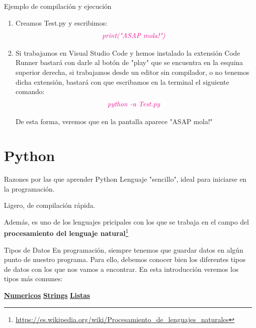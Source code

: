 \documentclass{beamer}
\begin{document}
	\begin{frame}{Ejemplo de compilación y ejecución}
	\begin{enumerate}
		\item Creamos Test.py y escribimos: 
		\begin{gather}
		\color{magenta}\textit{print("ASAP mola!")}
		\end{gather}
		\item Si trabajamos en Visual Studio Code y hemos instalado la extensión Code Runner bastará con darle al botón de "play" que se encuentra en la esquina superior derecha, si trabajamos desde un editor sin compilador, o no tenemos dicha extensión, bastará con que escribamos en la terminal el siguiente comando:
		\begin{gather}
			\color{magenta}\textit{python -u Test.py}
		\end{gather}
	
		De esta forma, veremos que en la pantalla aparece "ASAP mola!"
	\end{enumerate}
	\end{frame}
\section{Python}
    \begin{frame}{Razones por las que aprender Python}
    	\setlength{\parskip}{8mm} %
        Lenguaje "sencillo", ideal para iniciarse en la programación.
        
        Ligero, de compilación rápida.
        
        Además, es uno de los lenguajes pricipales con los que se trabaja en el campo del \textbf{procesamiento del lenguaje natural}\footnote{\url{https://es.wikipedia.org/wiki/Procesamiento_de_lenguajes_naturales}}
    \end{frame}
    \begin{frame}{Tipos de Datos}
    	En programación, siempre tenemos que guardar datos en algún punto de nuestro programa. Para ello, debemos conocer bien los diferentes tipos de datos con los que nos vamos a encontrar. En esta introducción veremos los tipos más comunes:
		\vspace{1cm}
		
	 \centering\hyperlink{datos:numericos}{\textbf{Numericos}}
		\hspace{3cm} \hyperlink{datos:strings}{\textbf{Strings}}
		\hspace{3cm} \hyperlink{datos:listas}{\textbf{Listas}}
    \end{frame}
    
\end{document}
